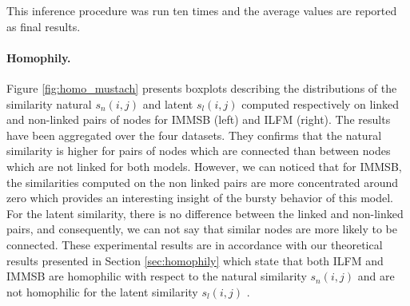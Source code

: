 This inference procedure was run ten times and the average values are reported as final results.


\paragraph{Homophily.} Figure \ref{fig:homo_mustach} presents boxplots describing the distributions of the similarity natural $s_n(i,j)$ and latent $s_l(i,j)$ computed respectively on linked and non-linked pairs of nodes for IMMSB (left) and ILFM (right). The results have been aggregated over the four datasets.  They confirms that the natural similarity is  higher for  pairs of nodes which are connected than between nodes which are not linked for both models. However, we can noticed that for IMMSB, the similarities computed on the non linked pairs are more concentrated around zero which provides an interesting insight of the bursty behavior of this model. For the latent similarity,  there is no difference between the linked and non-linked pairs, and consequently, we can not say that similar nodes are more likely to be connected. These experimental results are in accordance with our theoretical results presented in Section \ref{sec:homophily} which state that both ILFM and IMMSB are homophilic with respect to the natural similarity $s_n(i,j)$ and are not homophilic for the latent similarity $s_l(i,j)$ .

